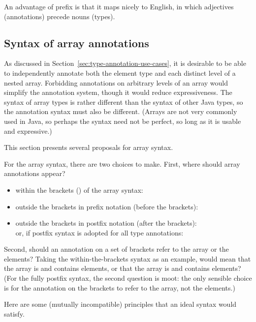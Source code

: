 An advantage of prefix is that it maps nicely to English, in which
adjectives (annotations) precede nouns (types).


\subsection{Syntax of array annotations}
\label{sec:array-syntax}

As discussed in Section~\ref{sec:type-annotation-use-cases}, it is
desirable to be able to independently annotate both the element type and
each distinct level of a nested array.
Forbidding annotations on arbitrary levels of an array would simplify the
annotation system, though it would reduce expressiveness.
The syntax of array types is rather different than the syntax of other
Java types, so the annotation syntax must also be different.
(Arrays are not very commonly used in Java, so perhaps the syntax need not
be perfect, so long as it is usable and expressive.)

This section presents several proposals for array syntax.

For the array syntax, there are two choices to make.  First, where should 
array annotations appear?
\begin{itemize}
  \item within the brackets (\code{[]}) of the array syntax:
  \item outside the brackets in prefix notation (before the brackets):
  \item outside the brackets in postfix notation (after the brackets):
     \\ or, if postfix syntax is adopted
    for all type annotations: 
\end{itemize}
\noindent
Second, should an annotation on a set of brackets refer to the array or the
elements?  Taking the within-the-brackets syntax as an example, would
 mean that the array is 
and contains  elements, or that the array is  and
contains  elements?
(For the fully postfix syntax, the second question is moot:  the only sensible
choice is for the annotation on the brackets to refer to the array, not the
elements.)

Here are some (mutually incompatible) principles that an ideal syntax would satisfy.

